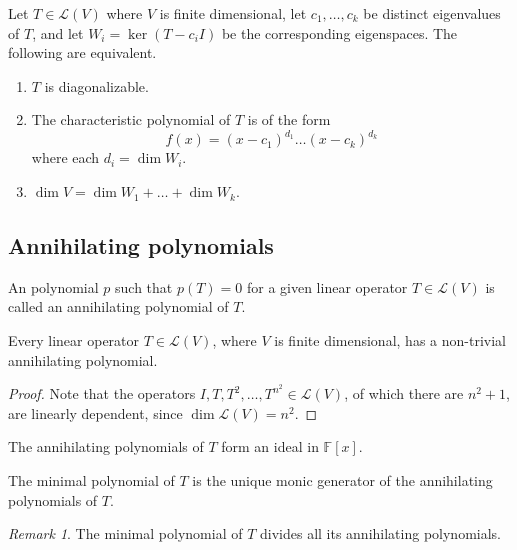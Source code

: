 \documentclass[11pt]{article}
\newcommand{\F}{\mathbb{F}}
\newcommand{\I}{I}
\newcommand{\alg}[1]{\mathscr{#1}}
\newcommand{\algL}{\alg{L}}
\renewcommand{\ker}{\operatorname{ker}}
\newcommand{\dim}{\operatorname{dim}}
\theoremstyle{definition}
\theoremstyle{remark}
\newtheorem*{remark}{Remark}
\numberwithin{equation}{section}
\begin{document}
    \begin{theorem}
        Let $T \in \algL(V)$ where $V$ is finite dimensional, let $c_1, \dots, c_k$
        be distinct eigenvalues of $T$, and let $W_i = \ker(T - c_iI)$ be the
        corresponding eigenspaces. The following are equivalent.
        \begin{enumerate}
            \itemsep0em
            \item $T$ is diagonalizable.
            \item The characteristic polynomial of $T$ is of the form \[
                f(x) = (x - c_1)^{d_1} \dots (x - c_k)^{d_k}
            \] where each $d_i = \dim{W_i}$.
            \item $\dim{V} = \dim{W_1} + \dots + \dim{W_k}$.
        \end{enumerate}
    \end{theorem}

    \subsection{Annihilating polynomials}
    
    \begin{definition}
        An polynomial $p$ such that $p(T) = 0$ for a given linear operator $T \in
        \algL(V)$ is called an annihilating polynomial of $T$.
    \end{definition}

    \begin{lemma}
        Every linear operator $T\in\algL(V)$, where $V$ is finite dimensional, has
        a non-trivial annihilating polynomial.
    \end{lemma}
    \begin{proof}
        Note that the operators $\I, T, T^2, \dots, T^{n^2} \in \algL(V)$, of
        which there are $n^2 + 1$, are linearly dependent, since $\dim{\algL(V)} =
        n^2$.
    \end{proof}

    \begin{lemma}
        The annihilating polynomials of $T$ form an ideal in $\F[x]$.
    \end{lemma}

    \begin{definition}
        The minimal polynomial of $T$ is the unique monic generator of the
        annihilating polynomials of $T$.
        \begin{remark}
            The minimal polynomial of $T$ divides all its annihilating polynomials.
        \end{remark}
    \end{definition}
\end{document}
